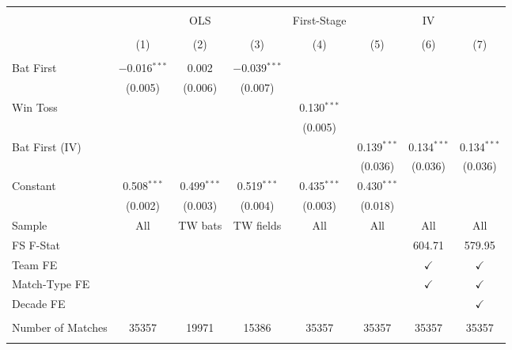 
\begin{tabular}{@{\extracolsep{5pt}}lccccccc} 
\\[-1.8ex]\hline \\[-1.8ex] 
 & \multicolumn{3}{c}{OLS} & First-Stage & \multicolumn{3}{c}{IV} \\ 
\\[-1.8ex] & (1) & (2) & (3) & (4) & (5) & (6) & (7)\\ 
\hline \\[-1.8ex] 
 Bat First & $-$0.016$^{***}$ & 0.002 & $-$0.039$^{***}$ &  &  &  &  \\ 
  & (0.005) & (0.006) & (0.007) &  &  &  &  \\ 
  Win Toss &  &  &  & 0.130$^{***}$ &  &  &  \\ 
  &  &  &  & (0.005) &  &  &  \\ 
  Bat First (IV) &  &  &  &  & 0.139$^{***}$ & 0.134$^{***}$ & 0.134$^{***}$ \\ 
  &  &  &  &  & (0.036) & (0.036) & (0.036) \\ 
  Constant & 0.508$^{***}$ & 0.499$^{***}$ & 0.519$^{***}$ & 0.435$^{***}$ & 0.430$^{***}$ &  &  \\ 
  & (0.002) & (0.003) & (0.004) & (0.003) & (0.018) &  &  \\ 
 Sample & All & TW bats & TW fields & All & All & All & All \\ 
FS F-Stat &  &  &  &  &  & 604.71 & 579.95 \\ 
Team FE &  &  &  &  &  & $\checkmark$ & $\checkmark$ \\ 
Match-Type FE &  &  &  &  &  & $\checkmark$ & $\checkmark$ \\ 
Decade FE &  &  &  &  &  &  & $\checkmark$ \\ 
\hline &  &  &  &  &  &  &  \\ 
Number of Matches & 35357 & 19971 & 15386 & 35357 & 35357 & 35357 & 35357 \\ 
\hline \\[-1.8ex] 
\end{tabular} 